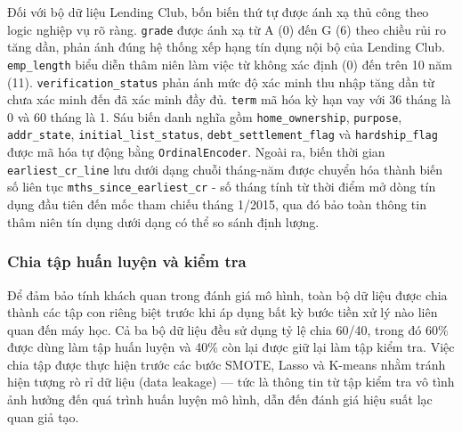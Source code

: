 Đối với bộ dữ liệu Lending Club, bốn biến thứ tự được ánh xạ thủ công theo logic nghiệp vụ rõ ràng. \texttt{grade} được ánh xạ từ A (0) đến G (6) theo chiều rủi ro tăng dần, phản ánh đúng hệ thống xếp hạng tín dụng nội bộ của Lending Club. \texttt{emp\_length} biểu diễn thâm niên làm việc từ không xác định (0) đến trên 10 năm (11). \texttt{verification\_status} phản ánh mức độ xác minh thu nhập tăng dần từ chưa xác minh đến đã xác minh đầy đủ. \texttt{term} mã hóa kỳ hạn vay với 36 tháng là 0 và 60 tháng là 1. Sáu biến danh nghĩa gồm \texttt{home\_ownership}, \texttt{purpose}, \texttt{addr\_state}, \texttt{initial\_list\_status}, \texttt{debt\_settlement\_flag} và \texttt{hardship\_flag} được mã hóa tự động bằng \texttt{OrdinalEncoder}. Ngoài ra, biến thời gian \texttt{earliest\_cr\_line} lưu dưới dạng chuỗi tháng-năm được chuyển hóa thành biến số liên tục \texttt{mths\_since\_earliest\_cr} - số tháng tính từ thời điểm mở dòng tín dụng đầu tiên đến mốc tham chiếu tháng 1/2015, qua đó bảo toàn thông tin thâm niên tín dụng dưới dạng có thể so sánh định lượng.

\subsubsection{Chia tập huấn luyện và kiểm tra}
\noindent
Để đảm bảo tính khách quan trong đánh giá mô hình, toàn bộ dữ liệu được chia thành các tập con riêng biệt trước khi áp dụng bất kỳ bước tiền xử lý nào liên quan đến máy học. Cả ba bộ dữ liệu đều sử dụng tỷ lệ chia 60/40, trong đó 60\% được dùng làm tập huấn luyện và 40\% còn lại được giữ lại làm tập kiểm tra. Việc chia tập được thực hiện trước các bước SMOTE, Lasso và K-means nhằm tránh hiện tượng rò rỉ dữ liệu (data leakage) — tức là thông tin từ tập kiểm tra vô tình ảnh hưởng đến quá trình huấn luyện mô hình, dẫn đến đánh giá hiệu suất lạc quan giả tạo.

